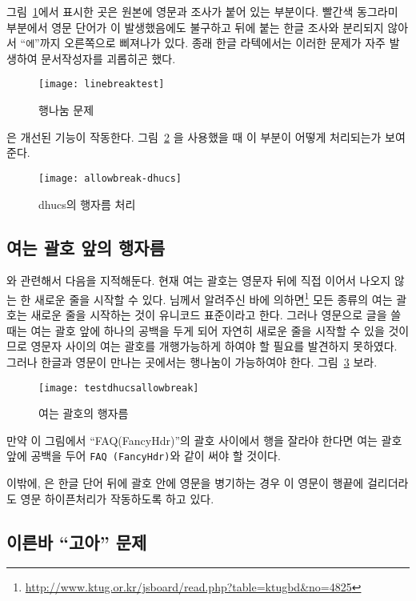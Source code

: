 그림~\ref{fig:allowbreakproblem}에서 표시한 곳은 원본에 영문과 조사가 붙어 있는 부분이다.
빨간색 동그라미 부분에서 영문 단어가 이 발생했음에도 불구하고 
뒤에 붙는 한글 조사와 분리되지 않아서 ``\verb|에|''까지 오른쪽으로 
삐져나가 있다. 종래 한글 라텍에서는 이러한 문제가 자주 발생하여
문서작성자를 괴롭히곤 했다.

\begin{figure}
\centering
\texttt{[image: linebreaktest]}
\caption{행나눔 문제}\label{fig:allowbreakproblem}
\end{figure}

\kotex 은 개선된  기능이 작동한다. 그림~\ref{fig:allowbreakdone}\는
\kotex 을 사용했을 때 이 부분이 어떻게 처리되는가 보여준다.

\begin{figure}
\centering
\texttt{[image: allowbreak-dhucs]}
\caption{dhucs의 행자름 처리}\label{fig:allowbreakdone}
\end{figure}

\subsection{여는 괄호 앞의 행자름}

와 관련해서 다음을 지적해둔다. 현재 여는 괄호는 영문자 뒤에 직접
이어서 나오지 않는 한 새로운 줄을 시작할 수 있다.  님께서 알려주신 바에
의하면\footnote{\url{http://www.ktug.or.kr/jsboard/read.php?table=ktugbd&no=4825}}
모든 종류의 여는 괄호는 새로운 줄을 시작하는 것이 유니코드 표준이라고 한다.
그러나 영문으로 글을 쓸 때는 여는 괄호 앞에 하나의 공백을 두게 되어
자연히 새로운 줄을 시작할 수 있을 것이므로 영문자 사이의 여는 괄호를
개행가능하게 하여야 할 필요를 발견하지 못하였다. 그러나 한글과 영문이
만나는 곳에서는 행나눔이 가능하여야 한다. 그림~\ref{fig:openingparen}\을
보라.

\begin{figure}
\centering
\texttt{[image: testdhucsallowbreak]}
\caption{여는 괄호의 행자름}\label{fig:openingparen}
\end{figure}

만약 이 그림에서 ``FAQ(FancyHdr)''의 괄호 사이에서 행을 잘라야 한다면
여는 괄호 앞에 공백을 두어
\verb*|FAQ (FancyHdr)|와 같이 써야 할 것이다.

이밖에, \kotex 은 한글 단어 뒤에 괄호 안에 영문을
병기하는 경우 이 영문이 행끝에 걸리더라도 영문 하이픈처리가 작동하도록
하고 있다.

\subsection{이른바 ``고아'' 문제}

